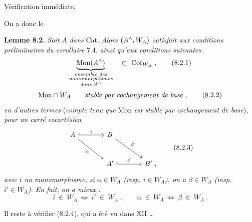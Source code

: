 Vérification immédiate.

On a donc le

\textbf{Lemme 8.2.} \textit{Soit $A$ dans} Cat. \textit{Alors $(A^{\wedge},W_A)$ satisfait aux conditions préliminaires du corollaire} 7.4, \textit{ainsi qu'aux conditions suivantes.}
\[
\underbrace{\Mon(A\chap)}_{\substack{\textit{ensemble des}\\ \textit{monomorphismes}\\ \textit{dans } A\chap}} \quad\subset\ \Cof_{W_A}\ ,
\tag*{(8.2.1)}
\]
\[
\mathrm{Mon}\cap W_A \qquad \textit{stable par cochangement de base}\ ,
\tag*{(8.2.2)}
\]
\textit{en d'autres termes} (\textit{compte tenu que} Mon \textit{est stable par cochangement de base}), \textit{pour un carré cocartésien}
\[
\begin{tikzcd}[row sep=large, column sep=large]
A \arrow[r, hook, "i"] \arrow[dr, "\alpha"'] & B \arrow[dr, "\beta"] & \\
& A' \arrow[r, hook, "i'"] & B'\ ,
\end{tikzcd}
\tag*{(8.2.3)}
\]
\textit{avec $i$ un monomorphisme, si $\alpha\in W_A$ (resp. $i\in W_A$), on a $\beta\in W_A$ (resp. $i'\in W_A$). En fait, on a mieux :}
\[
i\ \in\ W_A \ \Longleftrightarrow\ i'\ \in\ W_A\ , \qquad \alpha\ \in\ W_A \ \Longleftrightarrow\ \beta\ \in\ W_A\ .
\tag*{(8.2.4)}
\]

Il reste à vérifier (8.2.4), qui a été vu dans XII \ldots

